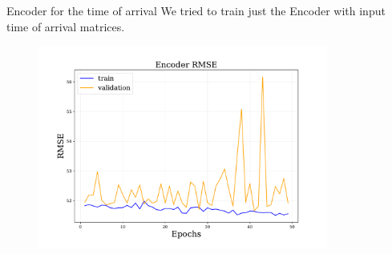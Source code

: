 \documentclass{beamer}
\begin{document}

\begin{frame}{Encoder for the time of arrival}
    We tried to train just the Encoder with input time of arrival matrices.
    \begin{figure}
        \centering
        \includegraphics[width=0.85\textwidth]{figures/encoder_rmse.pdf}
    \end{figure}
        
\end{frame}



    
\end{document}
